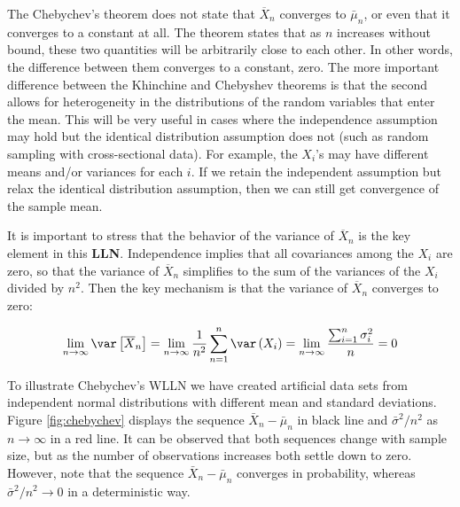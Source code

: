 \documentclass[english,12pt]{book}\usepackage[]{graphicx}\usepackage[]{xcolor}
\begin{document}
The Chebychev's theorem does not state that $\overline{X}_n$ converges to $\bar{\mu}_n$, or even that it converges to a constant at all. The theorem states that as $n$ increases without bound, these two quantities will be arbitrarily close to each other. In other words, the difference between them converges to a constant, zero. The more important difference between the Khinchine and Chebyshev theorems is that the second allows for heterogeneity in the distributions of the random variables that enter the mean. This will be very useful in cases where the independence assumption may hold but the identical distribution assumption does not (such as random sampling with cross-sectional data). For example, the $X_i$'s may have different means and/or variances for each $i$. If we retain the independent assumption but relax the identical distribution assumption, then we can still get convergence of the sample mean.

It is important to stress that the behavior of the variance of $\overline{X}_n$ is the key element in this \textbf{LLN}. Independence implies that all covariances among the $X_i$ are zero, so that the variance of $\overline{X}_n$ simplifies to the sum of the variances of the $X_i$ divided by $n^2$. Then the key mechanism is that the variance of $\overline{X}_n$ converges to zero:

\begin{equation*}
 \lim_{n\to\infty}\var\left[ \overline{X}_n\right]=\lim_{n\to\infty}\frac{1}{n^2}\sum_{n=1}^n\var\left(X_i\right)=\lim_{n\to\infty}\frac{\sum_{i = 1}^n\sigma^2_i}{n}=0 
\end{equation*}

To illustrate Chebychev's WLLN we have created artificial data sets from independent normal distributions with different mean and standard deviations. Figure \ref{fig:chebychev} displays the sequence $\bar{X}_n - \bar{\mu}_n$ in black line and $\bar{\sigma}^2 / n^2$ as $n\to \infty$ in a red line. It can be observed that both sequences change with sample size, but as the number of observations increases both settle down to zero.  However, note that the sequence $\bar{X}_n - \bar{\mu}_n$ converges in probability, whereas $\bar{\sigma}^2 / n^2\to 0$ in a deterministic way. 
\end{document}
